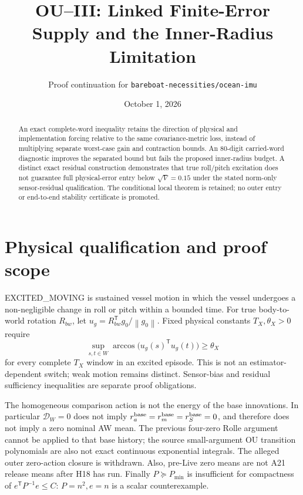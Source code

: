 \documentclass[11pt]{article}
\title{OU--III: Linked Finite-Error Supply and the Inner-Radius Limitation}
\author{Proof continuation for \texttt{bareboat-necessities/ocean-imu}}
\date{October 1, 2026}
\newcommand{\norm}[1]{\left\lVert#1\right\rVert}
\begin{document}
\maketitle
\begin{abstract}
An exact complete-word inequality retains the direction of physical and
implementation forcing relative to the same covariance-metric loss, instead
of multiplying separate worst-case gain and contraction bounds. An 80-digit
carried-word diagnostic improves the separated bound but fails the proposed
inner-radius budget. A distinct exact residual construction demonstrates that
true roll/pitch excitation does not guarantee full physical-error entry below
$\sqrt V=0.15$ under the stated norm-only sensor-residual qualification.
The conditional local theorem is retained; no outer entry or end-to-end
stability certificate is promoted.
\end{abstract}

\section{Physical qualification and proof scope}
EXCITED\_MOVING is sustained vessel motion in which the vessel undergoes a
non-negligible change in roll or pitch within a bounded time. For true
body-to-world rotation $R_{bw}$, let $u_g=R_{bw}^{\mathsf T}g_0/\norm{g_0}$.
Fixed physical constants $T_X,\theta_X>0$ require
\[
 \sup_{s,t\in W}\arccos\bigl(u_g(s)^{\mathsf T}u_g(t)\bigr)\ge\theta_X
\]
for every complete $T_X$ window in an excited episode. This is not an
estimator-dependent switch; weak motion remains distinct. Sensor-bias and
residual sufficiency inequalities are separate proof obligations.

The homogeneous comparison action is not the energy of the base innovations.
In particular $\mathcal D_W=0$ does not imply $r_a^{\rm base}=r_m^{\rm base}
=r_S^{\rm base}=0$, and therefore does not imply a zero nominal AW mean.
The previous four-zero Rolle argument cannot be applied to that base history;
the source small-argument OU transition polynomials are also not exact
continuous exponential integrals. The alleged outer zero-action closure is
withdrawn. Also, pre-Live zero means are not A21 release means after H18 has
run. Finally $P\succeq P_{\min}$ is insufficient for compactness of
$e^{\mathsf T}P^{-1}e\le C$: $P=n^2,e=n$ is a scalar counterexample.
\end{document}
